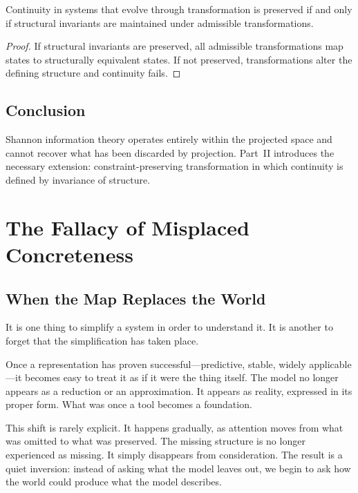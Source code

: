 \documentclass[11pt,openany]{book}
\begin{document}
\begin{proposition}
Continuity in systems that evolve through transformation is
preserved if and only if structural invariants are
maintained under admissible transformations.
\end{proposition}

\begin{proof}
If structural invariants are preserved, all admissible
transformations map states to structurally equivalent states.
If not preserved, transformations alter the defining
structure and continuity fails.
\end{proof}

\section{Conclusion}
\label{sec:conclusion-information}

Shannon information theory operates entirely within the
projected space and cannot recover what has been discarded
by projection. Part~II introduces the necessary extension:
constraint-preserving transformation in which continuity is
defined by invariance of structure.


\chapter{The Fallacy of Misplaced Concreteness}
\label{ch:misplaced-concreteness}

\section*{ When the Map Replaces the World}

It is one thing to simplify a system in order to understand it. It is another to forget that the simplification has taken place.

Once a representation has proven successful—predictive, stable, widely applicable—it becomes easy to treat it as if it were the thing itself. The model no longer appears as a reduction or an approximation. It appears as reality, expressed in its proper form. What was once a tool becomes a foundation.

This shift is rarely explicit. It happens gradually, as attention moves from what was omitted to what was preserved. The missing structure is no longer experienced as missing. It simply disappears from consideration. The result is a quiet inversion: instead of asking what the model leaves out, we begin to ask how the world could produce what the model describes.
\end{document}
